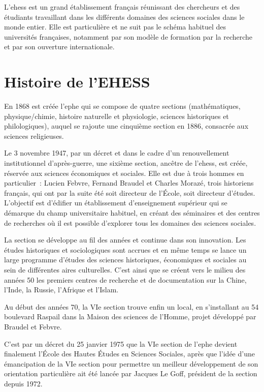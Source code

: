 
L'\acrfull{ehess} est un grand établissement français réunissant des chercheurs et des étudiants travaillant dans les différents domaines des sciences sociales dans le monde entier. Elle est particulière et ne suit pas le schéma habituel des universités françaises, notamment par son modèle de formation par la recherche et par son ouverture internationale.

\section{Histoire de l'EHESS}
En 1868 est créée l'\acrfull{ephe} qui se compose de quatre sections (mathématiques, physique/chimie, histoire naturelle et physiologie, sciences historiques et philologiques), auquel se rajoute une cinquième section en 1886, consacrée aux sciences religieuses.

Le 3 novembre 1947, par un décret et dans le cadre d'un renouvellement institutionnel d'après-guerre, une sixième section, ancêtre de l'\acrshort{ehess}, est créée, réservée aux sciences économiques et sociales. Elle est due à trois hommes en particulier~: Lucien Febvre, Fernand Braudel et Charles Morazé, trois historiens français, qui ont par la suite été soit directeur de l'École, soit directeur d'études. L'objectif est d'édifier un établissement d'enseignement supérieur qui se démarque du champ universitaire habituel, en créant des séminaires et des centres de recherches où il est possible d'explorer tous les domaines des sciences sociales.

La section se développe au fil des années et continue dans son innovation. Les études historiques et sociologiques sont accrues et en même temps se lance un large programme d'études des sciences historiques, économiques et sociales au sein de différentes aires culturelles. C'est ainsi que se créent vers le milieu des années 50 les premiers centres de recherche et de documentation sur la Chine, l'Inde, la Russie, l'Afrique et l'Islam.

Au début des années 70, la VIe section trouve enfin un local, en s'installant au 54 boulevard Raspail dans la Maison des sciences de l'Homme, projet développé par Braudel et Febvre.

C'est par un décret du 25 janvier 1975 que la VIe section de l'\acrshort{ephe} devient finalement l'École des Hautes Études en Sciences Sociales, après que l'idée d'une émancipation de la VIe section pour permettre un meilleur développement de son orientation particulière ait été lancée par Jacques Le Goff, président de la section depuis 1972.

